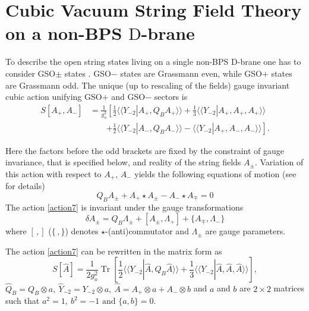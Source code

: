 \documentclass[a4paper,12pt]{article}
\newcommand{\ra}{\rightarrow}
\newcommand{\Tr}{\mathop{\mathrm{Tr}}\nolimits}
\newcommand{\la}{\langle\!\langle}
\renewcommand{\ra}{\rangle\!\rangle}
\begin{document}
\section{Cubic Vacuum String Field Theory on a non-BPS $\mathrm{D}$-brane }

To describe the open string states living on a
single non-BPS $\mathrm{D}$-brane one has to consider
GSO$\pm$ states \cite{sen-con}.
GSO$-$ states are Grassmann even, while
GSO$+$ states are Grassmann odd.
The unique (up to rescaling of the fields)
gauge invariant cubic action unifying GSO$+$
and GSO$-$ sectors is \cite{ABKM}
\begin{equation}
\begin{split}
S[A_+,A_-]&=\frac{1}{g^2_o}\left[
\frac{1}{2}\langle\!\langle Y_{-2}|A_+,Q_BA_+
\rangle\!\rangle+\frac{1}{3}\langle\!\langle
Y_{-2}|A_+,A_+,A_+\rangle\!\rangle
\right.\\
&~~~~~~~~~\left.+\frac{1}{2}\langle\!\langle
Y_{-2}|A_-,Q_BA_-\rangle\!\rangle
-\langle\!\langle
Y_{-2}|A_+,A_-,A_-\rangle\!\rangle\right].
\end{split}
\label{action7}
\end{equation}

Here the factors before the odd brackets are fixed by the
constraint of gauge invariance, that is specified below, and
reality of the string fields $A_{\pm}$. Variation of
this action with respect to $A_+$, $A_-$
yields the following equations of motion (see \cite{ABKM} for details)
\begin{equation}
Q_BA_{\pm}+A_+\star A_{\pm}
-A_-\star A_{\mp}=0
\label{eqmotion}
\end{equation}
The action \eqref{action7} is invariant under the
gauge transformations
\begin{equation*}
\delta A_{\pm}=Q_B\Lambda_{\pm}+[A_{\pm},\Lambda_+]
+\{A_{\mp},\Lambda_-\}
\end{equation*}
where $[\,,]$ ($\{\,,\}$) denotes $\star$-(anti)commutator
and $\Lambda_{\pm}$ are gauge parameters.

The action \eqref{action7}
can be rewritten in the matrix form
 as
\begin{equation}
S[\hat{A}]=\frac{1}{2g_o^2}\Tr\left[\frac{1}{2}\la Y_{-2}|\hat{A},\hat{Q}_B\hat{A}\ra
+\frac13\la Y_{-2}|\hat{A},\hat{A},\hat{A}\ra\right],
\label{theAction}
\end{equation}
$\hat{Q}_B=Q_B\otimes a,~\hat{Y}_{-2}=Y_{-2}\otimes a,~
\hat{A}=A_+\otimes a+A_-\otimes b
$ and $a$ and $b$ are $2\times 2$ matrices such that
$
a^2=1,~b^2=-1\text{ and }\{a,b\}=0.
$
\end{document}
